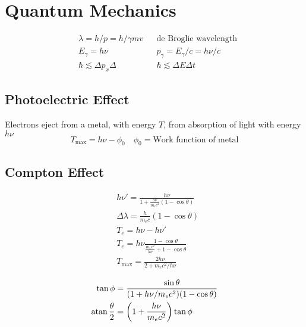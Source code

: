 \section{Quantum Mechanics}
\begin{align*}
& \lambda = h/p = h/\gamma m v & &\text{de Broglie wavelength} \\
& E_\gamma = h \nu & &p_\gamma = E_\gamma / c = h \nu / c \\
& \hbar \lesssim \Delta p_x \Delta  & & \hbar \lesssim \Delta E \Delta t
\end{align*}
\subsection{Photoelectric Effect}
Electrons eject from a metal, with energy $T$, from absorption of light with energy $h \nu$
\[
T_\text{max} = h \nu - \phi_0 \quad \phi_0 = \text{Work function of metal}
\]

\subsection{Compton Effect}
\begin{minipage}{\linewidth}%
\begin{minipage}[l]{0.40\linewidth}
\end{minipage}%
\begin{minipage}[r]{0.58\linewidth}
\begin{align*}
& h \nu' = \frac{h \nu}{1 + \frac{h\nu}{m_e c^2} (1 - \cos{\theta})} \\
& \Delta \lambda = \frac{h}{m_e c} (1 - \cos{\theta}) \\
& T_e = h\nu - h\nu' \\
& T_e = h \nu \frac{1-\cos{\theta}}{\frac{m_e c^2}{h \nu} + 1 - \cos{\theta}} \\
& T_\text{max} = \frac{2 h \nu}{2 + m_e c^2 / h \nu} 
\end{align*}
\end{minipage}%
\end{minipage}%
\begin{align*}
\tan{\phi} &= \frac{\sin{\theta}}{(1 + h\nu/m_e c^2)(1-\cos{\theta})} \\
\operatorname{atan}{\frac{\theta}{2}} &= \left(1 + \frac{h \nu}{m_e c^2} \right) \tan{\phi}
\end{align*}